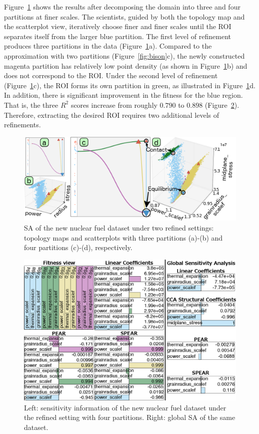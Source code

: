 Figure~\ref{fig:bisonRefined} shows the results after decomposing the domain into three and four partitions at finer scales.
%
The scientists, guided by both the topology map and the scatterplot view, iteratively choose finer and finer scales until the ROI separates itself from the larger blue partition.
%
The first level of refinement produces three partitions in the data (Figure~\ref{fig:bisonRefined}a).
%
Compared to the approximation with two partitions (Figure~\ref{fig:bison}c), the newly constructed magenta partition has relatively low point density (as shown in Figure~\ref{fig:bisonRefined}b) and does not correspond to the ROI.
%
Under the second level of refinement (Figure~\ref{fig:bisonRefined}c), the ROI forms its own partition in green, as illustrated in Figure~\ref{fig:bisonRefined}d.
%
In addition, there is significant improvement in the fitness for the blue region.
%
That is, the three $R^2$ scores increase from roughly $0.790$ to $0.898$ (Figure~\ref{fig:bisonRefined_sensitivity}).
%
Therefore, extracting the desired ROI requires two additional levels of refinements.

\begin{figure}[htbp]
  \centering
  \includegraphics[width=\linewidth]{figs/chap6/bisonRefined3}
  \caption{
  SA of the new nuclear fuel dataset under two refined settings:
  topology maps and scatterplots with three partitions (a)-(b) and four partitions (c)-(d), respectively.}
  \label{fig:bisonRefined}
\end{figure}

\begin{figure}[htbp]
  \centering
  \includegraphics[width=.48\textwidth]{figs/chap6/bisonRefinedSensitivity2}
  \caption{
  Left: sensitivity information of the new nuclear fuel dataset under the refined setting with four partitions.
  Right: global SA of the same dataset.
  }
  \label{fig:bisonRefined_sensitivity}
\end{figure}

